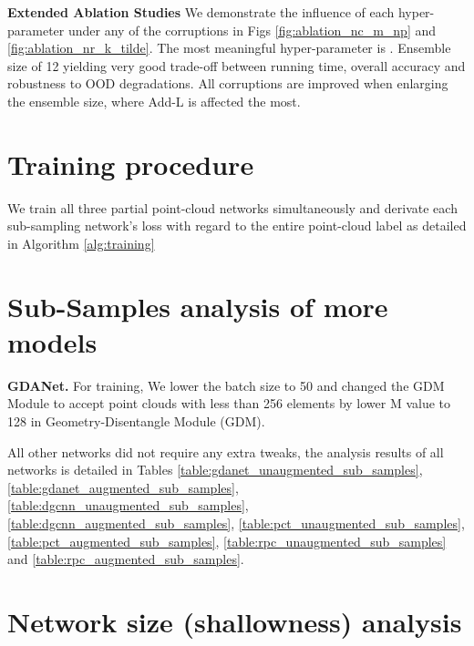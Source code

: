 \documentclass[10pt,twocolumn]{article}
\begin{document}
\textbf{Extended Ablation Studies}
We demonstrate the influence of each hyper-parameter under any of the corruptions in Figs \ref{fig:ablation_nc_m_np} and \ref{fig:ablation_nr_k_tilde}. The most meaningful hyper-parameter is . Ensemble size of 12 yielding very good trade-off between running time, overall accuracy and robustness to OOD degradations. All corruptions are improved when enlarging the ensemble size, where Add-L is affected the most.









\section{Training procedure} We train all three partial point-cloud networks simultaneously and derivate each sub-sampling network's loss with regard to the entire point-cloud label as detailed in Algorithm \ref{alg:training}


\section{Sub-Samples analysis of more models}
\textbf{GDANet.} For training, We lower the batch size to 50 and changed the GDM Module to accept point clouds with less than 256 elements by lower M value to 128 in Geometry-Disentangle Module (GDM).

All other networks did not require any extra tweaks, the analysis results of all networks is detailed in Tables
\ref{table:gdanet_unaugmented_sub_samples},
\ref{table:gdanet_augmented_sub_samples},
\ref{table:dgcnn_unaugmented_sub_samples}, 
\ref{table:dgcnn_augmented_sub_samples}, 
\ref{table:pct_unaugmented_sub_samples},
\ref{table:pct_augmented_sub_samples}, 
\ref{table:rpc_unaugmented_sub_samples} and
\ref{table:rpc_augmented_sub_samples}. 

\section{Network size (shallowness) analysis}
\end{document}
